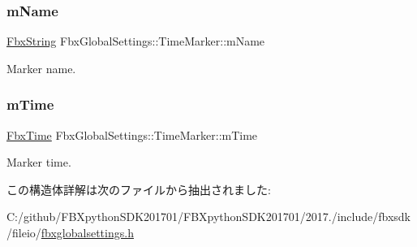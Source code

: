 \subsubsection{\texorpdfstring{m\+Name}{mName}}
{\footnotesize\ttfamily \hyperlink{class_fbx_string}{Fbx\+String} Fbx\+Global\+Settings\+::\+Time\+Marker\+::m\+Name}



Marker name. 

\mbox{\label{struct_fbx_global_settings_1_1_time_marker_abd5a09781e525fb49ba07310d03f1d9a}} 
\subsubsection{\texorpdfstring{m\+Time}{mTime}}
{\footnotesize\ttfamily \hyperlink{class_fbx_time}{Fbx\+Time} Fbx\+Global\+Settings\+::\+Time\+Marker\+::m\+Time}



Marker time. 



この構造体詳解は次のファイルから抽出されました\+:\begin{DoxyCompactItemize}
\item 
C\+:/github/\+F\+B\+Xpython\+S\+D\+K201701/\+F\+B\+Xpython\+S\+D\+K201701/2017./include/fbxsdk/fileio/\hyperlink{fbxglobalsettings_8h}{fbxglobalsettings.\+h}\end{DoxyCompactItemize}
